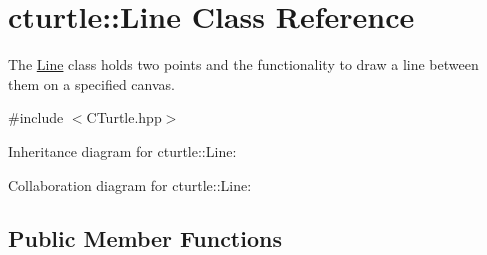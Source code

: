\hypertarget{classcturtle_1_1Line}{}\section{cturtle\+:\+:Line Class Reference}
\label{classcturtle_1_1Line}


The \hyperlink{classcturtle_1_1Line}{Line} class holds two points and the functionality to draw a line between them on a specified canvas.  




{\ttfamily \#include $<$C\+Turtle.\+hpp$>$}



Inheritance diagram for cturtle\+:\+:Line\+:


Collaboration diagram for cturtle\+:\+:Line\+:
\subsection*{Public Member Functions}

